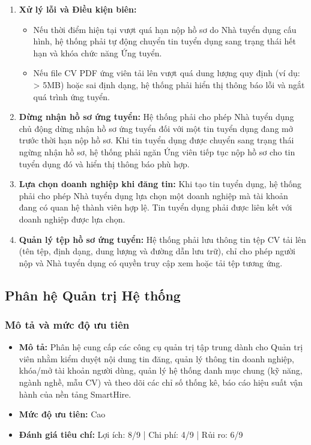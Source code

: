 \begin{enumerate}[label=\bfseries REQ-REC-\arabic*:, labelwidth=!, labelsep=0.5em, leftmargin=3.0cm]
    \item \textbf{Xử lý lỗi và Điều kiện biên:}
    \begin{itemize}
        \item Nếu thời điểm hiện tại vượt quá hạn nộp hồ sơ do Nhà tuyển dụng cấu hình, hệ thống phải tự động chuyển tin tuyển dụng sang trạng thái hết hạn và khóa chức năng Ứng tuyển.
        \item Nếu file CV PDF ứng viên tải lên vượt quá dung lượng quy định (ví dụ: > 5MB) hoặc sai định dạng, hệ thống phải hiển thị thông báo lỗi và ngắt quá trình ứng tuyển.
    \end{itemize}
    \item \textbf{Dừng nhận hồ sơ ứng tuyển:} Hệ thống phải cho phép Nhà tuyển dụng chủ động dừng nhận hồ sơ ứng tuyển đối với một tin tuyển dụng đang mở trước thời hạn nộp hồ sơ. Khi tin tuyển dụng được chuyển sang trạng thái ngừng nhận hồ sơ, hệ thống phải ngăn Ứng viên tiếp tục nộp hồ sơ cho tin tuyển dụng đó và hiển thị thông báo phù hợp.
    \item \textbf{Lựa chọn doanh nghiệp khi đăng tin:} Khi tạo tin tuyển dụng, hệ thống phải cho phép Nhà tuyển dụng lựa chọn một doanh nghiệp mà tài khoản đang có quan hệ thành viên hợp lệ. Tin tuyển dụng phải được liên kết với doanh nghiệp được lựa chọn.
    \item \textbf{Quản lý tệp hồ sơ ứng tuyển:} Hệ thống phải lưu thông tin tệp CV tải lên (tên tệp, định dạng, dung lượng và đường dẫn lưu trữ), chỉ cho phép người nộp và Nhà tuyển dụng có quyền truy cập xem hoặc tải tệp tương ứng.
\end{enumerate}

\subsection{Phân hệ Quản trị Hệ thống}

\subsubsection{Mô tả và mức độ ưu tiên}

\begin{itemize}
  \item \textbf{Mô tả:} Phân hệ cung cấp các công cụ quản trị tập trung dành cho Quản trị viên nhằm kiểm duyệt nội dung tin đăng, quản lý thông tin doanh nghiệp, khóa/mở tài khoản người dùng, quản lý hệ thống danh mục chung (kỹ năng, ngành nghề, mẫu CV) và theo dõi các chỉ số thống kê, báo cáo hiệu suất vận hành của nền tảng SmartHire.
  \item \textbf{Mức độ ưu tiên:} Cao
  \item \textbf{Đánh giá tiêu chí:} Lợi ích: 8/9 | Chi phí: 4/9 | Rủi ro: 6/9
\end{itemize}

